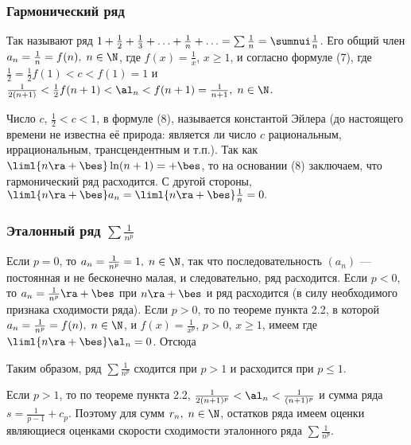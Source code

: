 \documentclass[a4paper]{article}
\begin{document}
\subsubsection{Гармонический ряд}
Так называют ряд $1 + \frac12+\frac13 + \ldots + \frac1n + \ldots =
\sum \frac1n = \sumnui\frac1n$. Его общий член $a_n = \frac1n =
f(n), \; n\in\N$, где $f(x)=\frac1x$, $x\ge 1$, и согласно формуле
(7),  где $\frac12 = \frac12 f(1) < c < f(1) = 1$ и
$\frac1{2(n+1)} < \frac12 f(n+1) < \al_n < f(n+1) = \frac1{n+1}, \;
n\in\N$.

Число $c$, $\frac12 < c < 1$, в формуле (8), называется константой
Эйлера (до настоящего времени не известна её природа: является ли
число $c$ рациональным, иррациональным, трансцендентным и т.п.). Так
как $\liml{n\ra+\bes} \ln(n+1)=+\bes$, то на основании (8)
заключаем, что гармонический ряд расходится. С другой стороны,
$\liml{n\ra+\bes} a_n = \liml{n\ra+\bes}\frac1n = 0.$

\subsubsection{Эталонный ряд $\sum\frac1{n^p}$}

Если $p=0$, то $a_n = \frac1{n^p} = 1, \; n\in\N$, так что
последовательность $(a_n)$ --- постоянная и не бесконечно малая, и
следовательно, ряд расходится. Если $p<0$, то $a_n =
\frac1{n^p}\ra+\bes$ при $n\ra+\bes$ и ряд расходится (в силу
необходимого признака сходимости ряда). Если $p>0$, то по теореме
пункта 2.2, в которой $a_n=\frac1{n^p}=f(n), \; n\in\N$, и
$f(x)=\frac1{x^p}$, $p>0$, $x\ge1$, имеем  где $\liml{n\ra+\bes} \al_n=0$. Отсюда

Таким образом, ряд $\sum \frac1{n^p}$ сходится при $p>1$ и
расходится при $p\le1$.

Если $p>1$, то по теореме пункта 2.2, $\frac1{2(n+1)^p} < \al_n <
\frac1{(n+1)^p}$ и сумма ряда $s=\frac1{p-1} + c_p$. Поэтому для
сумм $r_n, \; n\in\N$, остатков ряда имеем оценки 
являющиеся оценками скорости сходимости эталонного ряда
$\sum\frac1{n^p}.$
\end{document}
